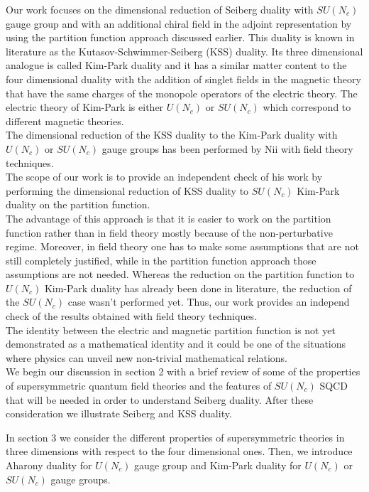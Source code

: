 Our work focuses on the dimensional reduction of Seiberg duality with $SU(N_c)$ gauge group 
and with an additional chiral field in the adjoint representation by using the partition function approach discussed earlier.
This duality is known in literature as the Kutasov-Schwimmer-Seiberg (KSS) duality.
Its three dimensional analogue is called Kim-Park duality and it has a similar matter content to the four dimensional duality with the addition of singlet fields in the magnetic theory that have the same charges of the monopole operators of the electric theory.
The electric theory of Kim-Park is either $U(N_c)$ or $SU(N_c)$ which correspond to different magnetic theories. 
 \\
The dimensional reduction of the KSS duality to the Kim-Park duality with $U(N_c)$ or $SU(N_c)$ gauge groups has been performed by Nii with field theory techniques.\\
The scope of our work is to provide an independent check of his work by performing the dimensional reduction of KSS duality to $SU(N_c)$ Kim-Park duality on the partition function.\\
The advantage of this approach is that it is easier to work on the partition function rather than in field theory mostly because of the non-perturbative regime.
Moreover, in field theory one has to make some assumptions that are not still completely justified, while in the partition function approach those assumptions are not needed.
Whereas the reduction on the partition function to $U(N_c)$ Kim-Park duality has already been done in literature, the reduction of the $SU(N_c)$ case wasn't performed yet.
Thus, our work provides an independ check of the results obtained with field theory techniques.\\
The identity between the electric and magnetic partition function is not yet demonstrated as a mathematical identity and it could be one of the situations where physics can unveil new non-trivial mathematical relations. 
\\

\pagestyle{intro}
We begin our discussion in section 2 with a brief review of some of the properties of supersymmetric quantum field theories and the features of $SU(N_c)$ SQCD that will be needed in order to understand Seiberg duality.
After these consideration we illustrate Seiberg and KSS duality.
\thispagestyle{intro}

In section 3 we consider the different properties of supersymmetric theories in three dimensions with respect to the four dimensional ones.
Then, we introduce Aharony duality for $U(N_c)$ gauge group and Kim-Park duality for $U(N_c)$ or $SU(N_c)$ gauge groups.


